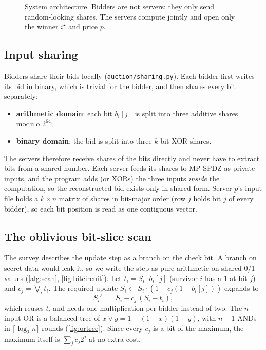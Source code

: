 \documentclass[11pt,a4paper]{article}
\newcommand{\code}[1]{\texttt{#1}}
\begin{document}
\begin{figure}[H]
  \centering
  \resizebox{0.92\linewidth}{!}{}
  \caption{System architecture. Bidders are not servers: they only send random-looking shares.
           The servers compute jointly and open only the winner $i^\star$ and price $p$.}
  \label{fig:architecture}
\end{figure}

\subsection{Input sharing}
\label{sec:input}

Bidders share their bids locally (\code{auction/sharing.py}). Each bidder first writes its bid in
binary, which is trivial for the bidder, and then shares every bit separately:
\begin{itemize}
  \item \textbf{arithmetic domain}: each bit $b_i[j]$ is split into three additive shares modulo
        $2^{64}$;
  \item \textbf{binary domain}: the bid is split into three $k$-bit XOR shares.
\end{itemize}
The servers therefore receive shares of the bits directly and never have to extract bits from a
shared number.
Each server feeds its shares to MP-SPDZ as private inputs, and the program adds (or XORs) the three
inputs \emph{inside} the computation, so the reconstructed bid exists only in shared form. Server
$p$'s input file holds a $k \times n$ matrix of shares in bit-major order (row $j$ holds bit $j$ of
every bidder), so each bit position is read as one contiguous vector.

\subsection{The oblivious bit-slice scan}
\label{sec:scan}

The survey describes the update step as a branch on the check bit. A branch on secret data would
leak it, so we write the step as pure arithmetic on shared 0/1 values (\cref{alg:scan},
\cref{fig:bitcircuit}). Let $t_i = S_i \cdot b_i[j]$ (survivor $i$ has a 1 at bit $j$) and
$c_j = \bigvee_i t_i$. The required update $S_i \leftarrow S_i \cdot (1 - c_j(1 - b_i[j]))$
expands to
\begin{equation}
  S_i' \;=\; S_i - c_j\,(S_i - t_i),
  \label{eq:update}
\end{equation}
which reuses $t_i$ and needs one multiplication per bidder instead of two. The $n$-input OR is a
balanced tree of $x \vee y = 1 - (1-x)(1-y)$, with $n-1$ ANDs in $\lceil\log_2 n\rceil$ rounds
(\cref{fig:ortree}). Since every $c_j$ is a bit of the maximum, the maximum itself is
$\sum_j c_j 2^j$ at no extra cost.
\end{document}
